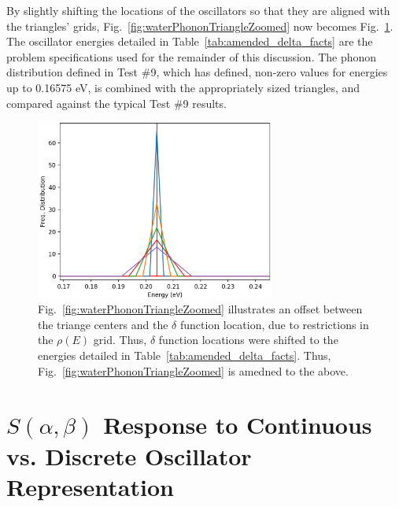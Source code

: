 \documentclass[Master.tex]{subfiles}
\begin{document}
    By slightly shifting the locations of the oscillators so that they are aligned with the triangles' grids, Fig.~\ref{fig:waterPhononTriangleZoomed} now becomes Fig.~\ref{fig:waterPhononTriangleZoomedShifted}. The oscillator energies detailed in Table~\ref{tab:amended_delta_facts} are the problem specifications used for the remainder of this discussion. The phonon distribution defined in Test \#9, which has defined, non-zero values for energies up to 0.16575 eV, is combined with the appropriately sized triangles, and compared against the typical Test \#9 results. 


    \begin{figure}[h]
      \begin{center}
        \includegraphics[width=0.7\textwidth]{alteredDeltaZoomedb}
        \caption[Triangles of various widths, plotted alongside shifted $\delta$ functions]{Fig.~\ref{fig:waterPhononTriangleZoomed} illustrates an offset between the triange centers and the $\delta$ function location, due to restrictions in the $\rho(E)$ grid. Thus, $\delta$ function locations were shifted to the energies detailed in Table~\ref{tab:amended_delta_facts}. Thus, Fig.~\ref{fig:waterPhononTriangleZoomed} is amedned to the above.}
        \label{fig:waterPhononTriangleZoomedShifted}
      \end{center}
    \end{figure}






\section{$S(\alpha,\beta)$ Response to Continuous vs. Discrete Oscillator Representation} 
\end{document}
